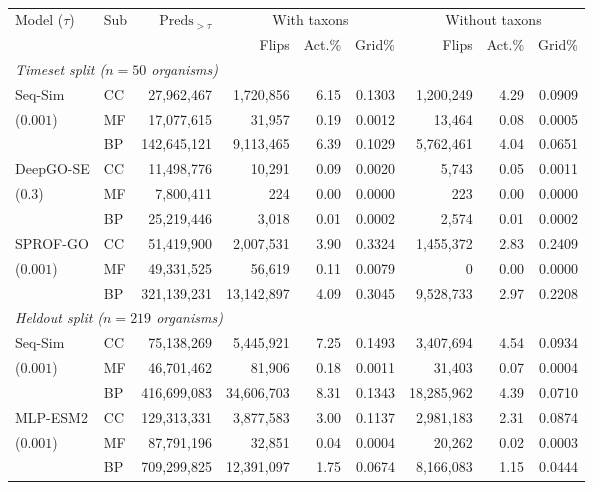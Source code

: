 \begin{table}[!t]
\centering
\caption{}
\label{tab:flips}
\footnotesize
\setlength{\tabcolsep}{2.5pt}
\begin{tabular}{ll r rrr rrr}
\toprule
Model ($\tau$) & Sub & $\text{Preds}_{>\tau}$ & \multicolumn{3}{c}{With taxons} & \multicolumn{3}{c}{Without taxons} \\
\cmidrule(lr){4-6}\cmidrule(lr){7-9}
& & & Flips & Act.\% & Grid\% & Flips & Act.\% & Grid\% \\
\midrule
\multicolumn{9}{l}{\emph{Timeset split ($n=50$ organisms)}} \\
Seq-Sim   & CC &  27{,}962{,}467 &  1{,}720{,}856 & 6.15 & 0.1303 & 1{,}200{,}249 & 4.29 & 0.0909 \\
($0.001$) & MF &  17{,}077{,}615 &     31{,}957   & 0.19 & 0.0012 &     13{,}464  & 0.08 & 0.0005 \\
          & BP & 142{,}645{,}121 &  9{,}113{,}465 & 6.39 & 0.1029 & 5{,}762{,}461 & 4.04 & 0.0651 \\
\midrule
DeepGO-SE & CC &  11{,}498{,}776 &     10{,}291   & 0.09 & 0.0020 &      5{,}743  & 0.05 & 0.0011 \\
($0.3$)   & MF &   7{,}800{,}411 &          224   & 0.00 & 0.0000 &          223  & 0.00 & 0.0000 \\
          & BP &  25{,}219{,}446 &      3{,}018   & 0.01 & 0.0002 &      2{,}574  & 0.01 & 0.0002 \\
\midrule
SPROF-GO  & CC &  51{,}419{,}900 &  2{,}007{,}531 & 3.90 & 0.3324 & 1{,}455{,}372 & 2.83 & 0.2409 \\
($0.001$) & MF &  49{,}331{,}525 &     56{,}619   & 0.11 & 0.0079 &             0 & 0.00 & 0.0000 \\
          & BP & 321{,}139{,}231 & 13{,}142{,}897 & 4.09 & 0.3045 & 9{,}528{,}733 & 2.97 & 0.2208 \\
\midrule
\multicolumn{9}{l}{\emph{Heldout split ($n=219$ organisms)}} \\
Seq-Sim   & CC &  75{,}138{,}269 &  5{,}445{,}921 & 7.25 & 0.1493 &  3{,}407{,}694 & 4.54 & 0.0934 \\
($0.001$) & MF &  46{,}701{,}462 &     81{,}906   & 0.18 & 0.0011 &     31{,}403   & 0.07 & 0.0004 \\
          & BP & 416{,}699{,}083 & 34{,}606{,}703 & 8.31 & 0.1343 & 18{,}285{,}962 & 4.39 & 0.0710 \\
\midrule
MLP-ESM2  & CC & 129{,}313{,}331 &  3{,}877{,}583 & 3.00 & 0.1137 &  2{,}981{,}183 & 2.31 & 0.0874 \\
($0.001$) & MF &  87{,}791{,}196 &     32{,}851   & 0.04 & 0.0004 &     20{,}262   & 0.02 & 0.0003 \\
          & BP & 709{,}299{,}825 & 12{,}391{,}097 & 1.75 & 0.0674 &  8{,}166{,}083 & 1.15 & 0.0444 \\
\bottomrule
\end{tabular}
\end{table}
